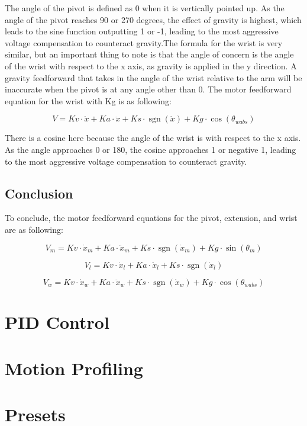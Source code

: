 \documentclass{scrartcl}
\DeclareMathOperator{\sgn}{sgn}
\begin{document}
The angle of the pivot is defined as 0 when it is vertically pointed up. As the angle of the pivot reaches 90 or 270 degrees, the effect of gravity is highest, which leads to the sine function outputting 1 or -1, leading to the most aggressive voltage compensation to counteract gravity.The formula for the wrist is very similar, but an important thing to note is that the angle of concern is the angle of the wrist with respect to the x axis, as gravity is applied in the y direction. A gravity feedforward that takes in the angle of the wrist relative to the arm will be inaccurate when the pivot is at any angle other than 0. The motor feedforward equation for the wrist with Kg is as following:

\begin{equation} \label{Motor Feedforward Equation with Gravity Wrist}
    V = Kv \cdot \dot{x} + Ka \cdot \ddot{x} + Ks \cdot \sgn(\dot{x}) + Kg \cdot \cos(\theta_{wabs})
\end{equation}

There is a cosine here because the angle of the wrist is with respect to the x axis. As the angle approaches 0 or 180, the cosine approaches 1 or negative 1, leading to the most aggressive voltage compensation to counteract gravity.
\subsection{Conclusion}
To conclude, the motor feedforward equations for the pivot, extension, and wrist are as following:

\begin{equation} \label{Motor Feedforward Equation Pivot}
    V_{m} = Kv \cdot \dot{x}_{m} + Ka \cdot \ddot{x}_{m} + Ks \cdot \sgn(\dot{x}_{m}) + Kg \cdot \sin(\theta_{m})
\end{equation}

\begin{equation} \label{Motor Feedforward Equation Extension}
    V_{l} = Kv \cdot \dot{x}_{l} + Ka \cdot \ddot{x}_{l} + Ks \cdot \sgn(\dot{x}_{l})
\end{equation}

\begin{equation} \label{Motor Feedforward Equation Wrist}
    V_{w} = Kv \cdot \dot{x}_{w} + Ka \cdot \ddot{x}_{w} + Ks \cdot \sgn(\dot{x}_{w}) + Kg \cdot \cos(\theta_{wabs})
\end{equation}

\section{PID Control}


\section{Motion Profiling}

\section{Presets}
\end{document}
